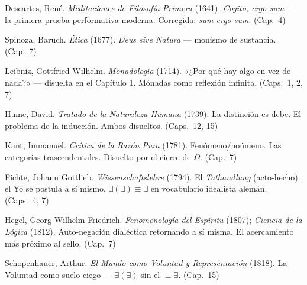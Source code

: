 \documentclass[10pt, openany, oneside]{book}
\begin{document}
{\vspace{0.3em}

\noindent Descartes, René. \textit{Meditaciones de Filosofía Primera} (1641). \textit{Cogito, ergo sum} --- la primera prueba performativa moderna. Corregida: \textit{sum ergo sum}. (Cap.\ 4)

\vspace{0.3em}

\noindent Spinoza, Baruch. \textit{Ética} (1677). \textit{Deus sive Natura} --- monismo de sustancia. (Cap.\ 7)

\vspace{0.3em}

\noindent Leibniz, Gottfried Wilhelm. \textit{Monadología} (1714). «¿Por qué hay algo en vez de nada?» --- disuelta en el Capítulo 1. Mónadas como reflexión infinita. (Caps.\ 1, 2, 7)

\vspace{0.3em}

\noindent Hume, David. \textit{Tratado de la Naturaleza Humana} (1739). La distinción es-debe. El problema de la inducción. Ambos disueltos. (Caps.\ 12, 15)

\vspace{0.3em}

\noindent Kant, Immanuel. \textit{Crítica de la Razón Pura} (1781). Fenómeno/noúmeno. Las categorías trascendentales. Disuelto por el cierre de $\Omega$. (Cap.\ 7)

\vspace{0.3em}

\noindent Fichte, Johann Gottlieb. \textit{Wissenschaftslehre} (1794). El \textit{Tathandlung} (acto-hecho): el Yo se postula a sí mismo. $\exists(\exists) \equiv \exists$ en vocabulario idealista alemán. (Caps.\ 4, 7)

\vspace{0.3em}

\noindent Hegel, Georg Wilhelm Friedrich. \textit{Fenomenología del Espíritu} (1807); \textit{Ciencia de la Lógica} (1812). Auto-negación dialéctica retornando a sí misma. El acercamiento más próximo al sello. (Cap.\ 7)

\vspace{0.3em}

\noindent Schopenhauer, Arthur. \textit{El Mundo como Voluntad y Representación} (1818). La Voluntad como suelo ciego --- $\exists(\exists)$ sin el $\equiv \exists$. (Cap.\ 15)

\vspace{0.3em}

}
\end{document}
